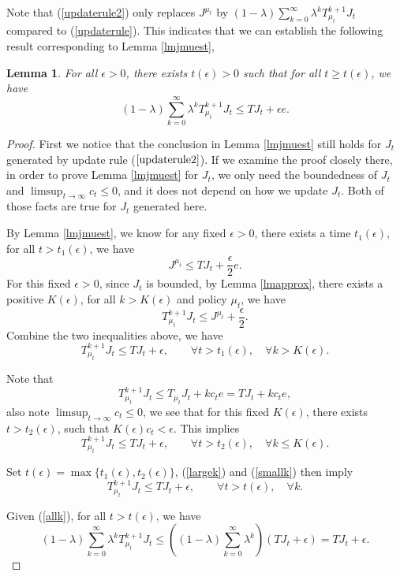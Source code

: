 \documentclass[12pt,a4paper]{amsart}
\numberwithin{equation}{section}
\theoremstyle{plain}
\newtheorem{Lemma}[Th]{Lemma}
\theoremstyle{definition}
\begin{document}
Note that (\ref{updaterule2}) only replaces $J^{\mu_t}$ by $(1-\lambda) \sum_{k=0}^{\infty} \lambda^k T_{\mu_t}^{k+1} J_t$ compared to (\ref{updaterule}). This indicates that we can establish the following result corresponding to Lemma \ref{lmjmuest},
\begin{Lemma} \label{lmjmuest2}
	For all $\epsilon > 0$, there exists $t(\epsilon) > 0$ such that for all $t \geq t(\epsilon)$, we have
	\begin{equation}\label{keyest2}
	(1-\lambda) \sum_{k=0}^{\infty} \lambda^k T_{\mu_t}^{k+1} J_t \leq T J_t + \epsilon e.
	\end{equation}
\end{Lemma}
\begin{proof}
	First we notice that the conclusion in Lemma \ref{lmjmuest} still holds for $J_t$ generated by update rule ($\ref{updaterule2}$). If we examine the proof closely there, in order to prove Lemma \ref{lmjmuest} for $J_t$, we only need the boundedness of $J_t$ and $\limsup_{t\to \infty} c_t \le 0 $, and it does not depend on how we update $J_t$. Both of those facts are true for $J_t$ generated here.  
	
	By Lemma \ref{lmjmuest}, we know for any fixed $\epsilon > 0$, there exists a time $t_1(\epsilon)$, for all $t > t_1(\epsilon)$, we have 
	$$
		J^{\mu_t} \le T J_t + \frac{\epsilon}{2} e. 
	$$
	For this fixed $\epsilon > 0$, since $J_t$ is bounded, by Lemma \ref{lmapprox}, there exists a positive $K(\epsilon)$, for all $k > K(\epsilon)$ and policy $\mu_t$, we have
	$$
		T_{\mu_t}^{k+1} J_t \le J^{\mu_t} + \frac{\epsilon}{2}. 
	$$
	Combine the two inequalities above,  we have
	\begin{equation} \label{largek}
		T_{\mu_t}^{k+1} J_t \le TJ_t + \epsilon,  \qquad \forall t > t_1(\epsilon),\quad  \forall k > K(\epsilon). 
	\end{equation}
	
	Note that
	$$
	T_{\mu_t}^{k+1} J_t \le T_{\mu_t} J_t + k c_t e = TJ_t + k c_t e,
	$$
	also note $\limsup_{t \to \infty} c_t\le 0$, we see that for this fixed $K(\epsilon)$, there exists $t > t_2(\epsilon)$, such that $K(\epsilon) c_t < \epsilon$. This implies
	\begin{equation}\label{smallk}
		T_{\mu_t}^{k+1} J_t \le TJ_t + \epsilon,  \qquad \forall t > t_2(\epsilon),\quad  \forall k \le K(\epsilon). 
	\end{equation}
	
	Set $t(\epsilon )= \max \{t_1(\epsilon), t_2(\epsilon)\}$, (\ref{largek}) and (\ref{smallk}) then imply
	\begin{equation} \label{allk}
		T_{\mu_t}^{k+1} J_t \le TJ_t + \epsilon,  \qquad \forall t > t(\epsilon),\quad  \forall k.
	\end{equation}
	

	
	Given (\ref{allk}), for all $t > t(\epsilon)$, we have
	$$
	(1-\lambda) \sum_{k=0}^{\infty} \lambda^k T_{\mu_t}^{k+1} J_t \leq  \left( (1-\lambda) \sum_{k=0}^{\infty} \lambda^k\right) (TJ_t + \epsilon) = TJ_t + \epsilon. 
	$$
\end{proof}
\end{document}
